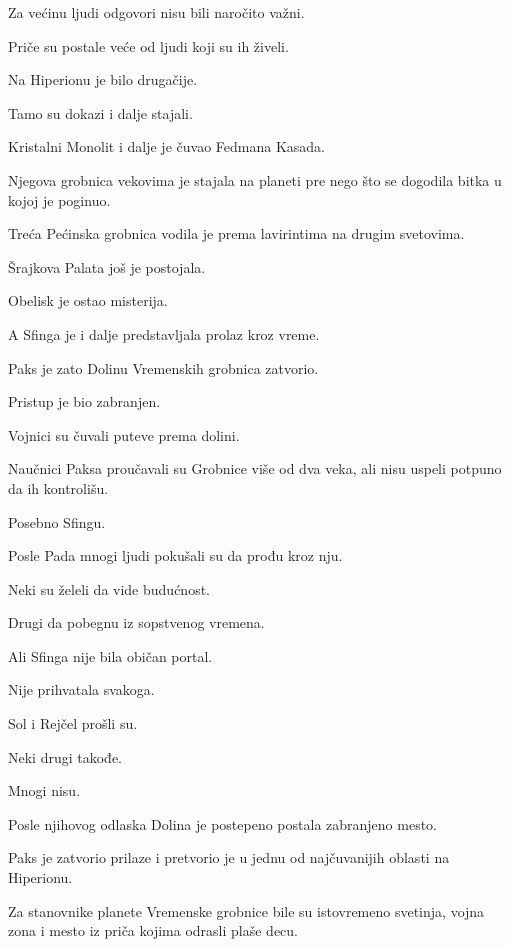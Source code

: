 \bigskip

Za većinu ljudi odgovori nisu bili naročito važni.

Priče su postale veće od ljudi koji su ih živeli.

\bigskip

Na Hiperionu je bilo drugačije.

Tamo su dokazi i dalje stajali.

\bigskip

Kristalni Monolit i dalje je čuvao Fedmana Kasada.

Njegova grobnica vekovima je stajala na planeti pre nego što se dogodila bitka u kojoj je poginuo.

Treća Pećinska grobnica vodila je prema lavirintima na drugim svetovima.

Šrajkova Palata još je postojala.

Obelisk je ostao misterija.

A Sfinga je i dalje predstavljala prolaz kroz vreme.

\bigskip

Paks je zato Dolinu Vremenskih grobnica zatvorio.

Pristup je bio zabranjen.

Vojnici su čuvali puteve prema dolini.

Naučnici Paksa proučavali su Grobnice više od dva veka, ali nisu uspeli potpuno da ih kontrolišu.

Posebno Sfingu.

\bigskip

Posle Pada mnogi ljudi pokušali su da prođu kroz nju.

Neki su želeli da vide budućnost.

Drugi da pobegnu iz sopstvenog vremena.

Ali Sfinga nije bila običan portal.

Nije prihvatala svakoga.

Sol i Rejčel prošli su.

Neki drugi takođe.

Mnogi nisu.

\bigskip

Posle njihovog odlaska Dolina je postepeno postala zabranjeno mesto.

Paks je zatvorio prilaze i pretvorio je u jednu od najčuvanijih oblasti na Hiperionu.

Za stanovnike planete Vremenske grobnice bile su istovremeno svetinja, vojna zona i mesto iz priča kojima odrasli plaše decu.

